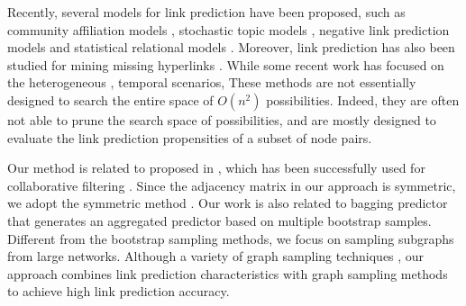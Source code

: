 Recently, several models for link prediction have been proposed,
such as  community affiliation models \cite{yang-wsdm2013}, stochastic topic models \cite{barbieri2014},
negative link prediction models \cite{tang2015} and statistical relational models \cite{bilgic,Getoor01,Getoor02}. 
Moreover, link prediction has also been studied for mining
missing hyperlinks \cite{west2015}.
While some recent work has focused on the heterogeneous \cite{yang}, temporal \cite{back,dwang} scenarios, 
These methods are not essentially
designed to search the entire space of $O(n^2)$ possibilities. Indeed, they are often not able to prune the search space of possibilities, and are mostly designed to evaluate the link prediction propensities of a subset of node pairs.

Our method is related to \NMF proposed in \cite{NMF-nature99}, which
has been successfully used for collaborative
filtering \cite{web}. Since the adjacency matrix in our approach is symmetric, we adopt
the symmetric \NMF method \cite{ding}.  Our work is also related
to bagging predictor \cite{Breiman96b-1996} that generates an aggregated
predictor based on multiple bootstrap samples. Different from the bootstrap
sampling methods, we focus on sampling subgraphs from large networks. Although a
variety of graph sampling techniques 
, our approach combines link
prediction characteristics \cite{leskovec-2008} with graph sampling
methods to achieve high link prediction accuracy.






